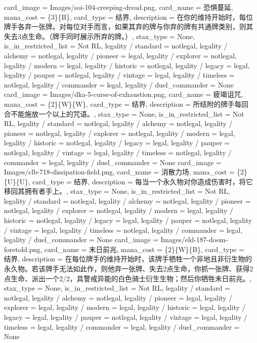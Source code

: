 \documentclass[lang = cn, color = black, 10pt]{AllThatStax}
\begin{document}
\card
{
	card_image = Images/soi-104-creeping-dread.png,
	card_name = 恐惧蔓延,
	mana_cost = \{3\}\{B\},
	card_type = 结界,
	description = 在你的维持开始时，每位牌手各弃一张牌。对每位对手而言，如果其弃的牌与你弃的牌有共通牌类别，则其失去3点生命。（牌手同时展示所弃的牌。）,
	stax_type = None,
	is_in_restricted_list = Not RL,
	legality / standard = notlegal,
	legality / alchemy = notlegal,
	legality / pioneer = legal,
	legality / explorer = notlegal,
	legality / modern = legal,
	legality / historic = notlegal,
	legality / legacy = legal,
	legality / pauper = notlegal,
	legality / vintage = legal,
	legality / timeless = notlegal,
	legality / commander = legal,
	legality / duel_commander = None
}
\card
{
	card_image = Images/dka-5-curse-of-exhaustion.png,
	card_name = 疲竭诅咒,
	mana_cost = \{2\}\{W\}\{W\},
	card_type = 结界,
	description = 所结附的牌手每回合不能施放一个以上的咒语。,
	stax_type = None,
	is_in_restricted_list = Not RL,
	legality / standard = notlegal,
	legality / alchemy = notlegal,
	legality / pioneer = notlegal,
	legality / explorer = notlegal,
	legality / modern = legal,
	legality / historic = notlegal,
	legality / legacy = legal,
	legality / pauper = notlegal,
	legality / vintage = legal,
	legality / timeless = notlegal,
	legality / commander = legal,
	legality / duel_commander = None
}
\card
{
	card_image = Images/clb-718-dissipation-field.png,
	card_name = 消散力场,
	mana_cost = \{2\}\{U\}\{U\},
	card_type = 结界,
	description = 每当一个永久物对你造成伤害时，将它移回其拥有者手上。,
	stax_type = None,
	is_in_restricted_list = Not RL,
	legality / standard = notlegal,
	legality / alchemy = notlegal,
	legality / pioneer = notlegal,
	legality / explorer = notlegal,
	legality / modern = legal,
	legality / historic = notlegal,
	legality / legacy = legal,
	legality / pauper = notlegal,
	legality / vintage = legal,
	legality / timeless = notlegal,
	legality / commander = legal,
	legality / duel_commander = None
}
\card
{
	card_image = Images/eld-187-doom-foretold.png,
	card_name = 末日前兆,
	mana_cost = \{2\}\{W\}\{B\},
	card_type = 结界,
	description = 在每位牌手的维持开始时，该牌手牺牲一个非地且非衍生物的永久物。若该牌手无法如此作，则他弃一张牌、失去2点生命，你抓一张牌、获得2点生命、派出一个2/2，具警戒异能的白色骑士衍生生物；然后你牺牲末日前兆。,
	stax_type = None,
	is_in_restricted_list = Not RL,
	legality / standard = notlegal,
	legality / alchemy = notlegal,
	legality / pioneer = legal,
	legality / explorer = legal,
	legality / modern = legal,
	legality / historic = legal,
	legality / legacy = legal,
	legality / pauper = notlegal,
	legality / vintage = legal,
	legality / timeless = legal,
	legality / commander = legal,
	legality / duel_commander = None
}
\end{document}
